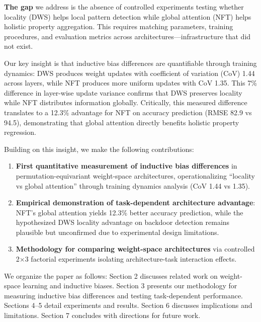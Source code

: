 \textbf{The gap} we address is the absence of controlled experiments testing whether locality (DWS) helps local pattern detection while global attention (NFT) helps holistic property aggregation. This requires matching parameters, training procedures, and evaluation metrics across architectures---infrastructure that did not exist.

Our key insight is that inductive bias differences are quantifiable through training dynamics: DWS produces weight updates with coefficient of variation (CoV) 1.44 across layers, while NFT produces more uniform updates with CoV 1.35. This 7\% difference in layer-wise update variance confirms that DWS preserves locality while NFT distributes information globally. Critically, this measured difference translates to a 12.3\% advantage for NFT on accuracy prediction (RMSE 82.9 vs 94.5), demonstrating that global attention directly benefits holistic property regression.

Building on this insight, we make the following contributions:

\begin{enumerate}
    \item \textbf{First quantitative measurement of inductive bias differences} in permutation-equivariant weight-space architectures, operationalizing ``locality vs global attention'' through training dynamics analysis (CoV 1.44 vs 1.35).

    \item \textbf{Empirical demonstration of task-dependent architecture advantage}: NFT's global attention yields 12.3\% better accuracy prediction, while the hypothesized DWS locality advantage on backdoor detection remains plausible but unconfirmed due to experimental design limitations.

    \item \textbf{Methodology for comparing weight-space architectures} via controlled 2$\times$3 factorial experiments isolating architecture-task interaction effects.
\end{enumerate}

We organize the paper as follows: Section 2 discusses related work on weight-space learning and inductive biases. Section 3 presents our methodology for measuring inductive bias differences and testing task-dependent performance. Sections 4--5 detail experiments and results. Section 6 discusses implications and limitations. Section 7 concludes with directions for future work.
